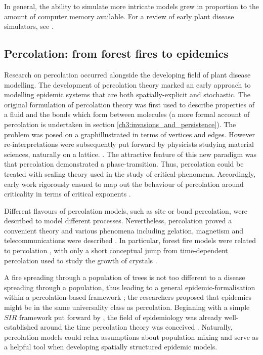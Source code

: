 In general, the ability to simulate more intricate models grew in proportion to the amount of computer memory available.
For a review of early plant disease simulators, see \cite{doi:10.1146/annurev.py.23.090185.002031}.

\subsection{Percolation: from forest fires to epidemics}
\label{section:lit-rev-perc}

Research on percolation occurred alongside the developing field of plant disease modelling.
The development of percolation theory marked an early approach to modelling epidemic systems that are
both spatially-explicit and stochastic.
The original formulation of percolation theory was first used to describe properties of a fluid and the 
bonds which form between molecules \cite{perco_origin} (a more formal account of 
percolation is undertaken in section \ref{ch3:invasions_and_persistence}). The problem was posed on a 
graph\textemdash illustrated in terms of vertices and edges. However re-interpretations were subsequently 
put forward by physicists studying material sciences, naturally on a lattice. \cite{Essam_1980}. 
The attractive feature of this new paradigm was that percolation demonstrated a phase-transition. 
Thus, percolation could be treated with scaling theory used in the study of critical-phenomena. 
Accordingly, early work rigorously ensued to map out the behaviour of percolation around criticality in 
terms of critical exponents \cite{STAUFFER19791}. 

Different flavours of percolation models, such as site or bond percolation, were described
to model different processes. Nevertheless, percolation proved a convenient theory and various phenomena including gelation, 
magnetism and telecommunications were described \cite{trove.nla.gov.au/work/26493727}. In particular, 
forest fire models were related to percolation \cite{MacKay_1984}, 
with only a short conceptual jump from time-dependent percolation used to study the growth of crystals \cite{Family_1985}. 

A fire spreading through a population of trees is not too different to a disease spreading through 
a population, thus leading to a general epidemic-formalisation within a percolation-based framework
\cite{pub.1059067807}; the researchers proposed that epidemics might be in the same universality class
as percolation. Beginning with a simple $SIR$ framework put forward by \cite{kermack-model}, the field 
of epidemiology was already well-established around the time percolation theory was conceived \cite{baily1975mathematical}. 
Naturally, percolation models could relax assumptions about population mixing and serve as a helpful tool
when developing spatially structured epidemic models.

